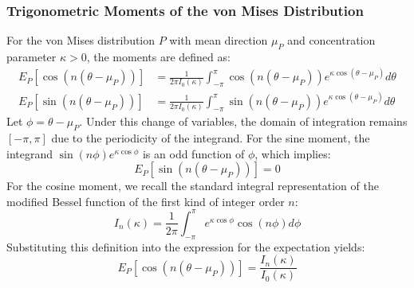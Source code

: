 \documentclass[11pt,a4paper]{article}
\begin{document}
\subsubsection{Trigonometric Moments of the von Mises Distribution}
For the von Mises distribution $P$ with mean direction $\mu_P$ and concentration parameter $\kappa > 0$, the moments are defined as:
\begin{align}
E_P[\cos(n(\theta - \mu_P))] &= \frac{1}{2\pi I_0(\kappa)} \int_{-\pi}^{\pi} \cos(n(\theta - \mu_P)) e^{\kappa \cos(\theta - \mu_P)} d\theta \\
E_P[\sin(n(\theta - \mu_P))] &= \frac{1}{2\pi I_0(\kappa)} \int_{-\pi}^{\pi} \sin(n(\theta - \mu_P)) e^{\kappa \cos(\theta - \mu_P)} d\theta
\end{align}
Let $\phi = \theta - \mu_P$. Under this change of variables, the domain of integration remains $[-\pi, \pi]$ due to the periodicity of the integrand.
For the sine moment, the integrand $\sin(n\phi) e^{\kappa \cos\phi}$ is an odd function of $\phi$, which implies:
\begin{equation}
E_P[\sin(n(\theta - \mu_P))] = 0
\end{equation}
For the cosine moment, we recall the standard integral representation of the modified Bessel function of the first kind of integer order $n$:
\begin{equation}
I_n(\kappa) = \frac{1}{2\pi} \int_{-\pi}^{\pi} e^{\kappa \cos\phi} \cos(n\phi) d\phi
\end{equation}
Substituting this definition into the expression for the expectation yields:
\begin{equation}
E_P[\cos(n(\theta - \mu_P))] = \frac{I_n(\kappa)}{I_0(\kappa)}
\end{equation}
\end{document}
